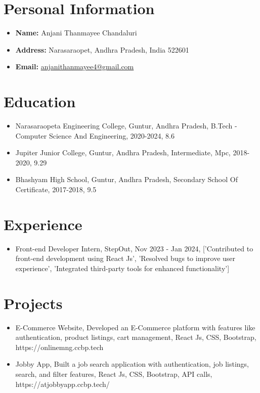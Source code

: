 \documentclass[a4paper,10pt]{article}
\begin{document}
\section*{Personal Information}
\begin{itemize}
    \item \textbf{Name:} Anjani Thanmayee Chandaluri
    \item \textbf{Address:} Narasaraopet, Andhra Pradesh, India 522601
    \item \textbf{Email:} \href{mailto:anjanithanmayee4@gmail.com}{anjanithanmayee4@gmail.com}
\end{itemize}

\section*{Education}
\begin{itemize}
    \begin{itemize}
\item Narasaraopeta Engineering College, Guntur, Andhra Pradesh, B.Tech - Computer Science And Engineering, 2020-2024, 8.6
\item Jupiter Junior College, Guntur, Andhra Pradesh, Intermediate, Mpc, 2018-2020, 9.29
\item Bhashyam High School, Guntur, Andhra Pradesh, Secondary School Of Certificate, 2017-2018, 9.5
\end{itemize}
\end{itemize}

\section*{Experience}
\begin{itemize}
    \begin{itemize}
\item Front-end Developer Intern, StepOut, Nov 2023 - Jan 2024, ['Contributed to front-end development using React Js', 'Resolved bugs to improve user experience', 'Integrated third-party tools for enhanced functionality']
\end{itemize}
\end{itemize}

\section*{Projects}
\begin{itemize}
    \begin{itemize}
\item E-Commerce Website, Developed an E-Commerce platform with features like authentication, product listings, cart management, React Js, CSS, Bootstrap, https://onlinemng.ccbp.tech
\item Jobby App, Built a job search application with authentication, job listings, search, and filter features, React Js, CSS, Bootstrap, API calls, https://atjobbyapp.ccbp.tech/
\end{itemize}
\end{itemize}
\end{document}
